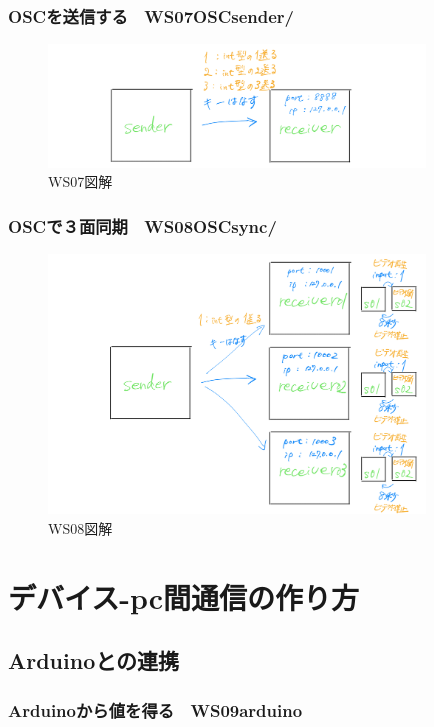 \documentclass[10pt, dvipdfmx]{beamer}
\begin{document}
        \begin{frame}
            \frametitle{OSCを送信する　WS07OSCsender/}
                \begin{figure}[htb]
                    \includegraphics[width=100mm]{images/ws06-1.png}
                    \caption{WS07図解}
                    \label{fig:04}
                \end{figure}
        \end{frame}

        \begin{frame}
            \frametitle{OSCで３面同期　WS08OSCsync/}
                \begin{figure}[htb]
                    \includegraphics[width=100mm]{images/ws08-1.png}
                    \caption{WS08図解}
                    \label{fig:05}
                \end{figure}
        \end{frame}

    \section{デバイス-pc間通信の作り方}
    \subsection{Arduinoとの連携}
        \frametitle{Arduinoから値を得る　WS09arduino}
        \begin{frame}
        \end{frame}
\end{document}
